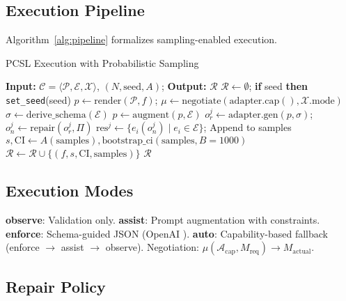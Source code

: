 \documentclass[sigconf]{acmart}
\newcommand{\breakablefunction}[1]{\texttt{\seqsplit{#1}}}
\begin{document}
\subsection{Execution Pipeline}

Algorithm~\ref{alg:pipeline} formalizes sampling-enabled execution.

\begin{algorithm}[t]
\caption{PCSL Execution with Probabilistic Sampling}
\label{alg:pipeline}
\scriptsize
\begin{algorithmic}[1]
\STATE \textbf{Input:} \( \mathcal{C} = \langle \mathcal{P}, \mathcal{E}, \mathcal{X} \rangle \), \( (N, \text{seed}, A) \); \textbf{Output:} \( \mathcal{R} \)
\STATE \( \mathcal{R} \leftarrow \emptyset \); \textbf{if} seed \textbf{then} \texttt{set\_seed}(seed)
  \STATE \( p \leftarrow \text{render}(\mathcal{P}, f) \); \( \mu \leftarrow \text{negotiate}(\text{adapter.cap}(), \mathcal{X}.\text{mode}) \)
   \STATE \( \sigma \leftarrow \text{derive\_schema}(\mathcal{E}) \) \ENDIF
   \STATE \( p \leftarrow \text{augment}(p, \mathcal{E}) \) \ENDIF
    \STATE \( o_r^j \leftarrow \text{adapter.gen}(p, \sigma) \); \( o_n^j \leftarrow \text{repair}(o_r^j, \Pi) \)
    \STATE \( \text{res}^j \leftarrow \{e_i(o_n^j) \mid e_i \in \mathcal{E}\} \); Append to samples
  \ENDFOR
  \STATE \( s, \text{CI} \leftarrow A(\text{samples}), \text{bootstrap\_ci}(\text{samples}, B=1000) \)
  \STATE \( \mathcal{R} \leftarrow \mathcal{R} \cup \{(f, s, \text{CI}, \text{samples})\} \)
\ENDFOR
\RETURN \( \mathcal{R} \)
\end{algorithmic}
\end{algorithm}

\subsection{Execution Modes}

\textbf{observe}: Validation only. \textbf{assist}: Prompt augmentation with constraints. 
\textbf{enforce}: Schema-guided JSON (OpenAI \breakablefunction{response\_format}). 
\textbf{auto}: Capability-based fallback (enforce \(\to\) assist \(\to\) observe). 
Negotiation: \( \mu(\mathcal{A}_{\text{cap}}, M_{\text{req}}) \to M_{\text{actual}} \).

\subsection{Repair Policy}
\end{document}
